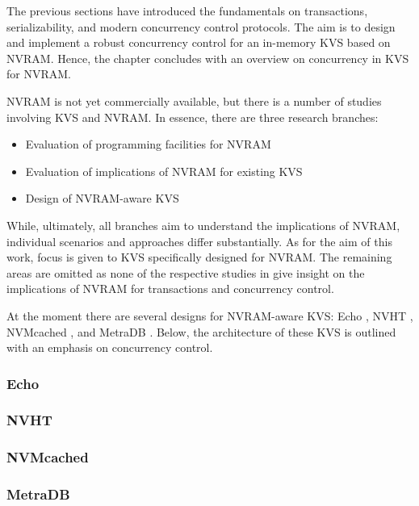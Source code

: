 The previous sections have introduced the fundamentals on transactions,
serializability, and modern concurrency control protocols. The aim is to design
and implement a robust concurrency control for an in-memory KVS based on NVRAM.
Hence, the chapter concludes with an overview on concurrency in KVS for NVRAM.

NVRAM is not yet commercially available, but there is a number of studies
involving KVS and NVRAM. In essence, there are three research branches:

\begin{itemize}
    \item Evaluation of programming facilities for NVRAM
    \item Evaluation of implications of NVRAM for existing KVS
    \item Design of NVRAM-aware KVS
\end{itemize}

While, ultimately, all branches aim to understand the implications of NVRAM,
individual scenarios and approaches differ substantially. As for the aim of this
work, focus is given to KVS specifically designed for NVRAM. The remaining areas
are omitted as none of the respective studies in
\cite{venkataraman2011consistent, pelley2013storage, volos2014aerie,
lersch2017analysis, malinowski2017using} give insight on the implications of
NVRAM for transactions and concurrency control.

At the moment there are several designs for NVRAM-aware KVS: Echo
\cite{bailey2013exploring}, NVHT \cite{zhou2016nvht}, NVMcached
\cite{wu2016nvmcached}, and MetraDB \cite{marmol2016nonvolatile}. Below, the
architecture of these KVS is outlined with an emphasis on concurrency control.

\subsubsection{Echo}
\subsubsection{NVHT}
\subsubsection{NVMcached}
\subsubsection{MetraDB}

